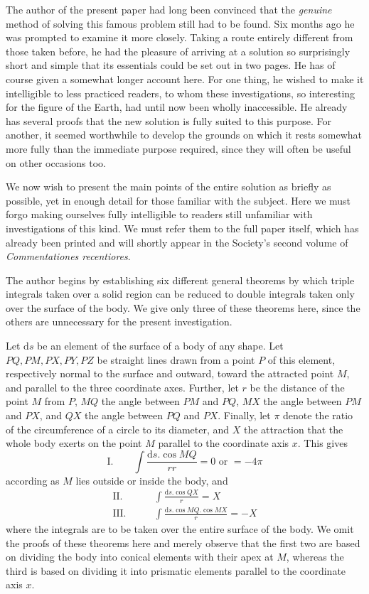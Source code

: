 The author of the present paper had long been convinced that the \textit{genuine} method of solving this famous problem still had to be found. Six months ago he was prompted to examine it more closely. Taking a route entirely different from those taken before, he had the pleasure of arriving at a solution so surprisingly short and simple that its essentials could be set out in two pages. He has of course given a somewhat longer account here. For one thing, he wished to make it intelligible to less practiced readers, to whom these investigations, so interesting for the figure of the Earth, had until now been wholly inaccessible. He already has several proofs that the new solution is fully suited to this purpose. For another, it seemed worthwhile to develop the grounds on which it rests somewhat more fully than the immediate purpose required, since they will often be useful on other occasions too.

We now wish to present the main points of the entire solution as briefly as possible, yet in enough detail for those familiar with the subject. Here we must forgo making ourselves fully intelligible to readers still unfamiliar with investigations of this kind. We must refer them to the full paper itself, which has already been printed and will shortly appear in the Society's second volume of \textit{Commentationes recentiores}.

The author begins by establishing six different general theorems by which triple integrals taken over a solid region can be reduced to double integrals taken only over the surface of the body. We give only three of these theorems here, since the others are unnecessary for the present investigation.

Let $\mathrm{d}s$ be an element of the surface of a body of any shape. Let $PQ,PM,PX,PY,PZ$ be straight lines drawn from a point $P$ of this element, respectively normal to the surface and outward, toward the attracted point $M$, and parallel to the three coordinate axes. Further, let $r$ be the distance of the point $M$ from $P$, $MQ$ the angle between $PM$ and $PQ$, $MX$ the angle between $PM$ and $PX$, and $QX$ the angle between $PQ$ and $PX$. Finally, let $\pi$ denote the ratio of the circumference of a circle to its diameter, and $X$ the attraction that the whole body exerts on the point $M$ parallel to the coordinate axis $x$. This gives
\[
\text{I.}\qquad \int\frac{\mathrm{d}s.\cos MQ}{rr}=0\text{ or }=-4\pi
\]
according as $M$ lies outside or inside the body, and
\[
\begin{aligned}
\text{II.}\qquad &\int\frac{\mathrm{d}s.\cos QX}{r}=X\\
\text{III.}\qquad &\int\frac{\mathrm{d}s.\cos MQ.\cos MX}{r}=-X
\end{aligned}
\]
where the integrals are to be taken over the entire surface of the body. We omit the proofs of these theorems here and merely observe that the first two are based on dividing the body into conical elements with their apex at $M$, whereas the third is based on dividing it into prismatic elements parallel to the coordinate axis $x$.

